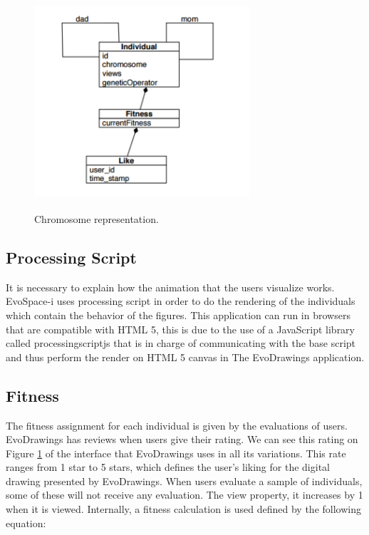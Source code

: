 \begin{figure}
\captionsetup{justification=centering,margin=2cm}
\centering
\setlength\fboxsep{0pt}
\setlength\fboxrule{0.7pt}
\includegraphics[width=8cm,height=8cm,keepaspectratio]{img/individual_dic.png}
\caption{Chromosome representation.}
\label{fig:individual_dic}
\end{figure}

\subsection{Processing Script}
It is necessary to explain how the animation that the users visualize works.
EvoSpace-i uses processing script in order to do the rendering of the
individuals which contain the behavior of the figures. This application can run
in browsers that are compatible with HTML 5, this is due to the use of a
JavaScript library called processingscriptjs that is in charge of communicating
with the base script and thus perform the render on HTML 5 canvas in The
EvoDrawings application.

\subsection{Fitness}
The fitness assignment for each individual is given by the
evaluations of users. EvoDrawings has reviews when users give their
rating. We can see this rating on Figure \ref{fig:individual_dic} of the
interface that EvoDrawings uses in all its variations. This rate ranges from 1
star to 5 stars, which defines the user's liking for the digital drawing
presented by EvoDrawings. When users evaluate a sample of individuals, some of
these will not receive any evaluation. The view property, it increases by 1 when
it is viewed. Internally, a fitness calculation is used defined by the following
equation:

